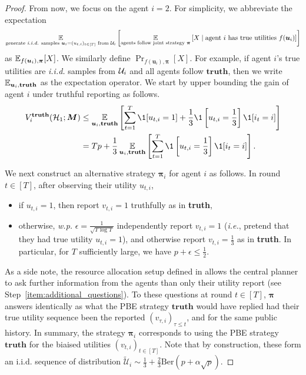 \begin{proof}
    From now, we focus on the agent $i=2$. For simplicity, we abbreviate the expectation
    \begin{equation*}
    \E_{\text{generate \textit{i.i.d.} samples }\bm u_i=(u_{t,i})_{t\in [T]}\text{ from }\mV_i} \left [\E_{\text{agents follow joint strategy }\bm \pi}\left [X\middle \vert \text{agent $i$ has true utilities }f(\bm u_i)\right ]\right ]
    \end{equation*}
    as $\E_{f(\bm u_i),\bm \pi}[X]$. We similarly define $\Pr_{f(\bm u_i),\bm \pi}[X]$. For example, if agent $i$'s true utilities are \textit{i.i.d.} samples from $\mathcal{U}_i$ and all agents follow $\textbf{truth}$, then we write $\E_{\bm u_i,\textbf{truth}}$ as the expectation operator.
    We start by upper bounding the gain of agent $i$ under truthful reporting as follows.
    \begin{align}
        V_i^{\textbf{truth}}(\mH_1;\bm M) &\leq \E_{\bm u_i,\textbf{truth}} \sqb{\sum_{t=1}^T \1[u_{t,i}=1] + \frac{1}{3} \1\sqb{u_{t,i}=\frac{1}{3}}\1[i_t=i] } \notag\\
        &= Tp + \frac{1}{3} \E_{\bm u_i,\textbf{truth}} \sqb{\sum_{t=1}^T  \1\sqb{u_{t,i}=\frac{1}{3}}\1[i_t=i] }. \label{eq:upper_bound_truth}
    \end{align}
    
    We next construct an alternative strategy $\bm\pi_i$ for agent $i$ as follows.     
    In round $t\in[T]$, after observing their utility $u_{t,i}$,
    \begin{itemize}
    \item if $u_{t,i}=1$, then report $v_{t,i}=1$ truthfully as in \textbf{truth},
    \item otherwise, \textit{w.p.} $\epsilon=\frac{1}{\sqrt{T\log T}}$ independently report $v_{t,i}=1$ (\textit{i.e.}, pretend that they had true utility $u_{t,i}=1$), and otherwise report $v_{t,i}=\frac 13$ as in \textbf{truth}. In particular, for $T$ sufficiently large, we have $p+\epsilon\leq \frac{1}{2}$.
    \end{itemize}
    As a side note, the resource allocation setup defined in  allows the central planner to ask further information from the agents than only their utility report (see Step~\ref{item:additional_questions}). To these questions at round $t\in[T]$, $\bm\pi$ answers identically as what the PBE strategy $\textbf{truth}$ would have replied had their true utility sequence been the reported $(v_{\tau, i})_{\tau\leq t}$, and for the same public history. 
    In summary, the strategy $\bm\pi_i$ corresponds to using the PBE strategy $\textbf{truth}$ for the biaised utilities $(v_{t,i})_{t\in[T]}$. Note that by construction, these form an i.i.d. sequence of distribution $\tilde {\mathcal U}_i\sim\frac{1}{3} + \frac{2}{3}\text{Ber}(p+\alpha\sqrt p)$. 
    

\end{proof}
